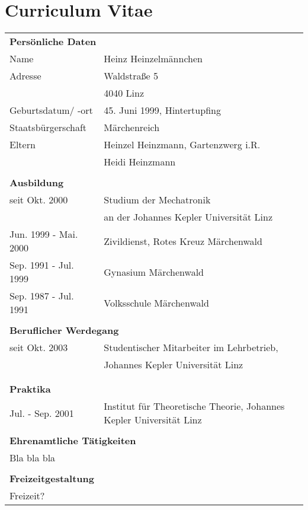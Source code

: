 \chapter*{Curriculum Vitae}

\setlength\extrarowheight{6pt}

\begin{longtable}[t]{ll}
	\multicolumn{2}{l}{\textbf{\Large Persönliche Daten}} \\
	Name & Heinz Heinzelmännchen \\
	Adresse & Waldstraße 5 \\
	 & 4040 Linz \\
	Geburtsdatum/ -ort & 45. Juni 1999, Hintertupfing \\
	Staatsbürgerschaft & Märchenreich \\
	Eltern & Heinzel Heinzmann, Gartenzwerg i.R. \\
	 &  Heidi Heinzmann \\
	\vspace*{3ex} \\ 
	\multicolumn{2}{l}{\textbf{\Large Ausbildung}} \\
	seit Okt. 2000 & Studium der Mechatronik \\
	 & an der Johannes Kepler Universität Linz \\
	Jun. 1999 - Mai. 2000 & Zivildienst, Rotes Kreuz Märchenwald \\
	Sep. 1991 - Jul. 1999 & Gynasium Märchenwald \\
	Sep. 1987 - Jul. 1991 & Volksschule Märchenwald \\
	\vspace*{3ex} \\
	\multicolumn{2}{l}{\textbf{\Large Beruflicher Werdegang}} \\
	seit Okt. 2003 & Studentischer Mitarbeiter im Lehrbetrieb, \\* & Johannes Kepler Universität Linz \\
	\vspace*{3ex} \\
	\pagebreak \\
	\multicolumn{2}{l}{\textbf{\Large Praktika}} \\
 	Jul. - Sep. 2001 & Institut für Theoretische Theorie, Johannes Kepler Universität Linz \\
 	\vspace*{3ex} \\
 	\multicolumn{2}{l}{\textbf{\Large Ehrenamtliche Tätigkeiten}} \\
 	\multicolumn{2}{l}{Bla bla bla} \\
 	\vspace*{3ex} \\
 	\multicolumn{2}{l}{\textbf{\Large Freizeitgestaltung}} \\
 	\multicolumn{2}{l}{Freizeit?} \\
\end{longtable}
